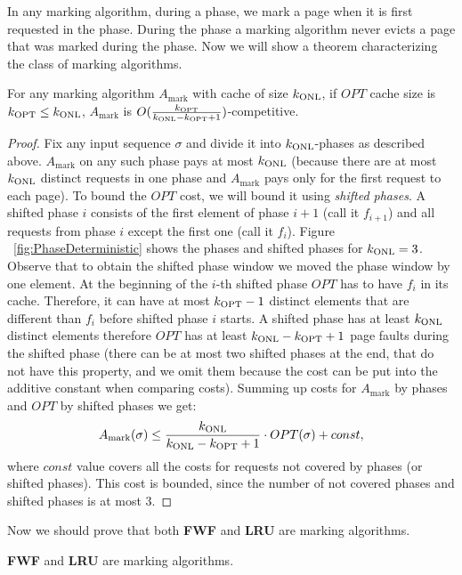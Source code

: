 In any marking algorithm, during a phase, we mark a page when it is first 
requested in the phase. During the phase a marking algorithm
never evicts a page that was marked during the phase. Now we will show a theorem 
characterizing the class of marking algorithms.
\begin{theorem}\cite{torng}
For any marking algorithm $A_{\mathrm{mark}}$ with cache of size 
$k_{\mathrm{ONL}}$, if $OPT$ 
cache size is $k_{\mathrm{OPT}} \leq k_{\mathrm{ONL}}$, $A_{\mathrm{mark}}$ is 
$O(\frac{k_{\mathrm{OPT}}}{k_{\mathrm{ONL}}-k_{\mathrm{OPT}}+1})$-competitive.
\end{theorem}
\begin{proof}
Fix any input sequence $\sigma$ and divide it into $k_{\mathrm{ONL}}$-phases as described 
above. $A_{\mathrm{mark}}$ on any such phase pays at most $k_{\mathrm{ONL}}$ (because there are 
at most 
$k_{\mathrm{ONL}}$ distinct requests in one phase and $A_{\mathrm{mark}}$ pays only
for the first request to each page). To bound the $OPT$ cost, we will
bound it using \textit{shifted phases}. A shifted phase $i$ consists 
of the first element of phase $i+1$ (call it $f_{i+1}$) and all requests from phase 
$i$ except the first one (call it $f_i$). Figure ~\ref{fig:PhaseDeterministic} shows the phases and shifted phases for $k_{\mathrm{ONL}}=3$. Observe
that to obtain the shifted phase window we moved the phase window by one element. At 
the beginning of the $i$-th shifted phase $OPT$ has to have $f_i$ in its cache. 
Therefore, it can have at most $k_{\mathrm{OPT}}-1$ distinct elements that are different than $f_i$ before shifted phase $i$ starts. 
A shifted phase has at least $k_{\mathrm{ONL}}$ distinct elements therefore $OPT$ has at least 
$k_{\mathrm{ONL}}-k_{\mathrm{OPT}}+1$ page faults during the shifted phase (there can be at most two shifted 
phases at the end, that do not have this property, and we omit them because the cost can be put 
into the additive constant when comparing costs).
Summing up costs for $A_{\mathrm{mark}}$ by phases and $OPT$ by shifted phases 
we get:
$$ A_{\mathrm{mark}}(\sigma) \leq \frac{k_{\mathrm{ONL}}}{k_{\mathrm{ONL}}-k_{\mathrm{OPT}}+1} \cdot OPT(\sigma) + const,$$
where $const$ value covers all the costs for requests not covered by phases (or 
shifted phases). This cost is bounded, since the number of not covered phases and shifted phases is at most 3.
\end{proof}
Now we should prove that both \textbf{FWF} and \textbf{LRU} are
marking algorithms.
\begin{propo}
 \textbf{FWF} and \textbf{LRU} are marking algorithms.
\end{propo}
